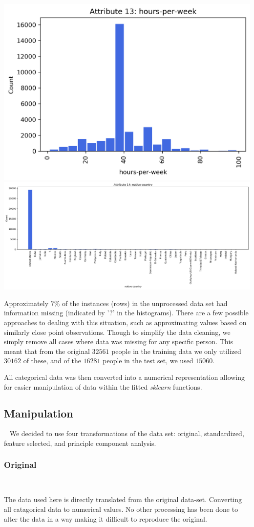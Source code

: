 \documentclass{article}
\begin{document}
\begin{center}
			\includegraphics[width=.4\textwidth]{images/12.png}		
			\includegraphics[width=.58\textwidth]{images/13.png}		

		\end{center}
		
		Approximately $7\%$ of the instances (rows) in the unprocessed data set had information missing (indicated by '?' in the histograms). There are a few possible approaches to dealing with this situation, such as approximating values based on similarly close point observations. Though to simplify the data cleaning, we simply remove all cases where data was missing for any specific person. This meant that from the original $ 32561 $ people in the training data we only utilized $ 30162 $ of these, and of the $ 16281 $ people in the test set, we used $ 15060 $.
		
		All categorical data was then converted into a numerical representation allowing for easier manipulation of data within the fitted \emph{sklearn} functions.
		
		\newpage
		\subsection{Manipulation}~
		We decided to use four transformations of the data set: original, standardized, feature selected, and principle component analysis.
		\subsubsection{Original}~
		
			The data used here is directly translated from the original data-set. Converting all catagorical data to numerical values. No other processing has been done to alter the data in a way making it difficult to reproduce the original.
		
\end{document}
